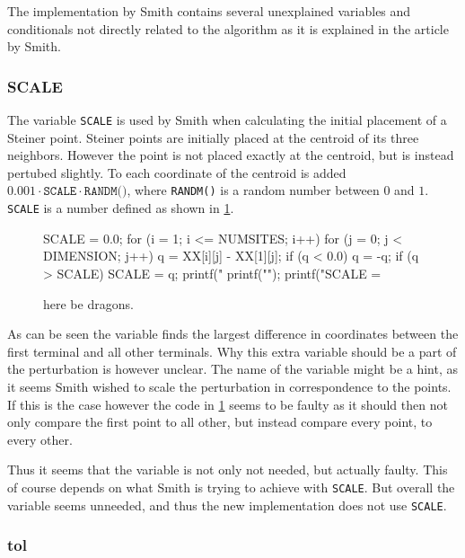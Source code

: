 The implementation by Smith contains several unexplained variables and conditionals not
directly related to the algorithm as it is explained in the article by Smith.

\subsubsection{SCALE}
\label{sec:scale}

The variable \texttt{SCALE} is used by Smith when calculating the initial
placement of a Steiner point.  Steiner points are initially placed at the
centroid of its three neighbors.  However the point is not placed exactly at the
centroid, but is instead pertubed slightly.  To each coordinate of the centroid
is added $0.001 \cdot \texttt{SCALE} \cdot \texttt{RANDM()}$, where \texttt{RANDM()} is a
random number between $0$ and $1$.  \texttt{SCALE} is a number defined as shown
in \cref{fig:randm}.

\begin{figure}[htbp]
  \begin{c-code}
    SCALE = 0.0;
    for (i = 1; i <= NUMSITES; i++) {
      for (j = 0; j < DIMENSION; j++) {
        q = XX[i][j] - XX[1][j];
        if (q < 0.0) q = -q;
        if (q > SCALE) SCALE = q;
        printf(" %
      }
      printf("\n");
    }
    printf("SCALE = %
  \end{c-code}
\caption[here be dragons]{here be dragons.\label{fig:randm}}
\end{figure}

As can be seen the variable finds the largest difference in coordinates between the first
terminal and all other terminals.  Why this extra variable should be a part of
the perturbation is however unclear.  The name of the variable might be a hint,
as it seems Smith wished to scale the perturbation in correspondence to the
points.  If this is the case however the code in \cref{fig:randm} seems to be
faulty as it should then not only compare the first point to all other, but
instead compare every point, to every other.

Thus it seems that the variable is not only not needed, but actually faulty.
This of course depends on what Smith is trying to achieve with \texttt{SCALE}.
But overall the variable seems unneeded, and thus the new implementation does
not use \texttt{SCALE}.

\subsubsection{tol}
\label{sec:tol}

